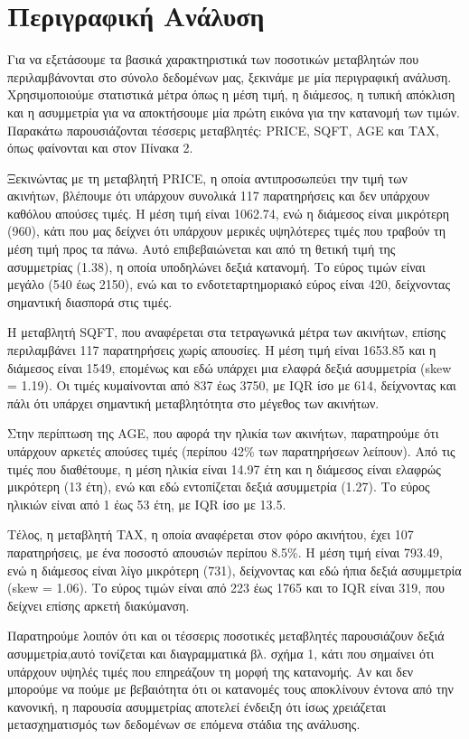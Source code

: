 \documentclass[
  10pt,
]{article}
\begin{document}
\section*{Περιγραφική Ανάλυση}

Για να εξετάσουμε τα βασικά χαρακτηριστικά των ποσοτικών μεταβλητών που
περιλαμβάνονται στο σύνολο δεδομένων μας, ξεκινάμε με μία περιγραφική
ανάλυση. Χρησιμοποιούμε στατιστικά μέτρα όπως η μέση τιμή, η διάμεσος, η
τυπική απόκλιση και η ασυμμετρία για να αποκτήσουμε μία πρώτη εικόνα για
την κατανομή των τιμών. Παρακάτω παρουσιάζονται τέσσερις μεταβλητές:
PRICE, SQFT, AGE και TAX, όπως φαίνονται και στον Πίνακα 2.

Ξεκινώντας με τη μεταβλητή PRICE, η οποία αντιπροσωπεύει την τιμή των
ακινήτων, βλέπουμε ότι υπάρχουν συνολικά 117 παρατηρήσεις και δεν
υπάρχουν καθόλου απούσες τιμές. Η μέση τιμή είναι 1062.74, ενώ η
διάμεσος είναι μικρότερη (960), κάτι που μας δείχνει ότι υπάρχουν
μερικές υψηλότερες τιμές που τραβούν τη μέση τιμή προς τα πάνω. Αυτό
επιβεβαιώνεται και από τη θετική τιμή της ασυμμετρίας (1.38), η οποία
υποδηλώνει δεξιά κατανομή. Το εύρος τιμών είναι μεγάλο (540 έως 2150),
ενώ και το ενδοτεταρτημοριακό εύρος είναι 420, δείχνοντας σημαντική
διασπορά στις τιμές.

Η μεταβλητή SQFT, που αναφέρεται στα τετραγωνικά μέτρα των ακινήτων,
επίσης περιλαμβάνει 117 παρατηρήσεις χωρίς απουσίες. Η μέση τιμή είναι
1653.85 και η διάμεσος είναι 1549, επομένως και εδώ υπάρχει μια ελαφρά
δεξιά ασυμμετρία (skew = 1.19). Οι τιμές κυμαίνονται από 837 έως 3750,
με IQR ίσο με 614, δείχνοντας και πάλι ότι υπάρχει σημαντική
μεταβλητότητα στο μέγεθος των ακινήτων.

Στην περίπτωση της AGE, που αφορά την ηλικία των ακινήτων, παρατηρούμε
ότι υπάρχουν αρκετές απούσες τιμές (περίπου 42\% των παρατηρήσεων
λείπουν). Από τις τιμές που διαθέτουμε, η μέση ηλικία είναι 14.97 έτη
και η διάμεσος είναι ελαφρώς μικρότερη (13 έτη), ενώ και εδώ εντοπίζεται
δεξιά ασυμμετρία (1.27). Το εύρος ηλικιών είναι από 1 έως 53 έτη, με IQR
ίσο με 13.5.

Τέλος, η μεταβλητή TAX, η οποία αναφέρεται στον φόρο ακινήτου, έχει 107
παρατηρήσεις, με ένα ποσοστό απουσιών περίπου 8.5\%. Η μέση τιμή είναι
793.49, ενώ η διάμεσος είναι λίγο μικρότερη (731), δείχνοντας και εδώ
ήπια δεξιά ασυμμετρία (skew = 1.06). Το εύρος τιμών είναι από 223 έως
1765 και το IQR είναι 319, που δείχνει επίσης αρκετή διακύμανση.

Παρατηρούμε λοιπόν ότι και οι τέσσερις ποσοτικές μεταβλητές παρουσιάζουν
δεξιά ασυμμετρία,αυτό τονίζεται και διαγραμματικά βλ. σχήμα 1, κάτι που
σημαίνει ότι υπάρχουν υψηλές τιμές που επηρεάζουν τη μορφή της
κατανομής. Αν και δεν μπορούμε να πούμε με βεβαιότητα ότι οι κατανομές
τους αποκλίνουν έντονα από την κανονική, η παρουσία ασυμμετρίας αποτελεί
ένδειξη ότι ίσως χρειάζεται μετασχηματισμός των δεδομένων σε επόμενα
στάδια της ανάλυσης.
\end{document}
